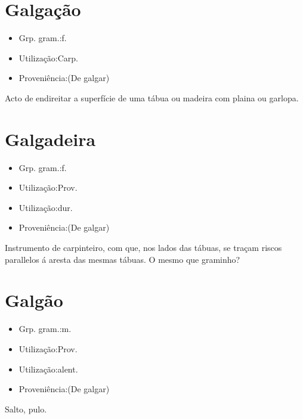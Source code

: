 \section{Galgação}
\begin{itemize}
\item {Grp. gram.:f.}
\end{itemize}
\begin{itemize}
\item {Utilização:Carp.}
\end{itemize}
\begin{itemize}
\item {Proveniência:(De \textunderscore galgar\textunderscore )}
\end{itemize}
Acto de endireitar a superfície de uma tábua ou madeira com plaina ou garlopa.
\section{Galgadeira}
\begin{itemize}
\item {Grp. gram.:f.}
\end{itemize}
\begin{itemize}
\item {Utilização:Prov.}
\end{itemize}
\begin{itemize}
\item {Utilização:dur.}
\end{itemize}
\begin{itemize}
\item {Proveniência:(De \textunderscore galgar\textunderscore )}
\end{itemize}
Instrumento de carpinteiro, com que, nos lados das tábuas, se traçam riscos parallelos á aresta das mesmas tábuas.
O mesmo que \textunderscore graminho\textunderscore ?
\section{Galgão}
\begin{itemize}
\item {Grp. gram.:m.}
\end{itemize}
\begin{itemize}
\item {Utilização:Prov.}
\end{itemize}
\begin{itemize}
\item {Utilização:alent.}
\end{itemize}
\begin{itemize}
\item {Proveniência:(De \textunderscore galgar\textunderscore )}
\end{itemize}
Salto, pulo.
